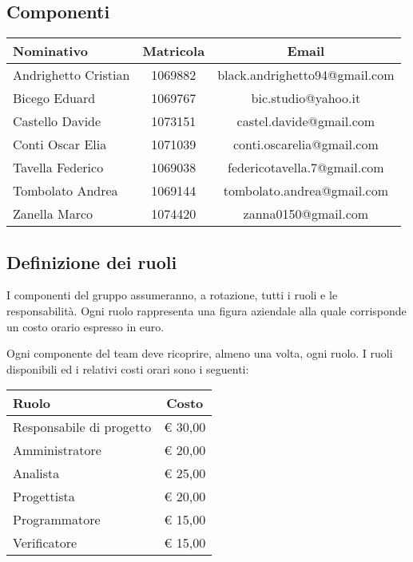 \documentclass[../PianoProgetto.tex]{subfiles}
\begin{document}
\begin{appendices}
\begin{table}[h]
	\end{table}
				
	\clearpage
	
	\subsection{Componenti}
	
		\begin{table}[h]
		\centering
	
		\begin{tabular}{lcc}
			\toprule
			Nominativo & Matricola & Email \\
			\midrule
			Andrighetto Cristian & 1069882 & black.andrighetto94@gmail.com \\
			\midrule
			Bicego Eduard& 1069767 & bic.studio@yahoo.it  \\
			\midrule
			Castello Davide	& 1073151 &	 castel.davide@gmail.com\\
			\midrule
			Conti Oscar Elia & 1071039 & conti.oscarelia@gmail.com \\
			\midrule
			Tavella Federico & 1069038 & federicotavella.7@gmail.com\\
			\midrule
			Tombolato Andrea & 1069144 & tombolato.andrea@gmail.com	 \\
			\midrule
			Zanella Marco & 1074420 & zanna0150@gmail.com \\
			\bottomrule
		\end{tabular}
		
		\end{table}		
		

	\subsection{Definizione dei ruoli}
	I componenti del gruppo \leaf assumeranno, a rotazione, tutti i ruoli e le responsabilità. Ogni ruolo rappresenta una figura aziendale alla quale corrisponde un costo orario espresso in euro.

Ogni componente del team deve ricoprire, almeno una volta, ogni ruolo.
I ruoli disponibili ed i relativi costi orari sono i seguenti:

	\begin{table}[h]
		\centering
	
		\begin{tabular}{lc}
			\toprule
			Ruolo & Costo \\
			\midrule
			Responsabile di progetto & \euro{} 30,00	 \\
			\midrule
			Amministratore & \euro{} 20,00	 \\
			\midrule
			Analista & \euro{} 25,00	 \\
			\midrule
			Progettista & \euro{} 20,00	 \\
			\midrule
			Programmatore & \euro{} 15,00	 \\
			\midrule
			Verificatore & \euro{} 15,00	 \\
			\bottomrule
		\end{tabular}
		
		\end{table}		
\end{appendices}
\end{document}
